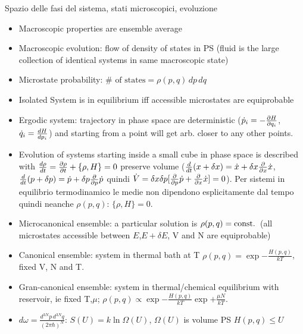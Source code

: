     \begin{frame}{Spazio delle fasi del sistema, stati microscopici, evoluzione}%
\begin{itemize}
    \item Macroscopic properties are ensemble average
    \item Macroscopic evolution: flow of density of states in PS (fluid is the large collection of identical systems in same macroscopic state)
    \item Microstate probability: $\#\text{ of states}=\rho(p,q)\,dp\,dq$
    \item Isolated System is in equilibrium iff accessible microstates are equiprobable
\item Ergodic system: trajectory in phase space are deterministic ($\dot{p}_i=-\PDy{q_i}{H}$, $\dot{q}_i=\TDy{p_i}{H}$) and starting from a point will get arb. closer to any other points.
\item Evolution of systems starting inside a small cube in phase space is described with $\TDy{t}{\rho}=\PDy{t}{\rho}+\{\rho,H\}=0$ preserve volume ($\TDof{t}(x+\delta x)=\dot{x}+\delta x\PDof{x}\dot{x}$,$\TDof{t}(p+\delta p)=\dot{p}+\delta p\PDof{p}\dot{p}$ quindi $\dot{V}=\delta x\delta p[\PDof{p}\dot{p}+\PDof{x}\dot{x}]=0$). Per sistemi in equilibrio termodinamico le medie non dipendono esplicitamente dal tempo quindi neanche $\rho(p,q)$: $\{\rho,H\}=0$.
\item Microcanonical ensemble: a particular solution is $\rho(p,q)=\const{}$ (all microstates accessible between $E$,$E+\delta E$, V and N are equiprobable)
\item Canonical ensemble: system in thermal bath at T $\rho(p,q)=\exp{-\frac{H(p,q)}{kT}}$, fixed V, N and T.
\item Gran-canonical ensemble: system in thermal/chemical equilibrium with reservoir, ie fixed T,$\mu$; $\rho(p,q)\propto\exp{-\frac{H(p,q)}{kT}}\exp{+\frac{\mu N}{kT}}$.
\item $d\omega=\frac{d^{3N}p\,d^{3N}q}{(2\pi\hbar)^N}$: $S(U)=k\ln{\Omega(U)}$, $\Omega(U)$ is volume PS $H(p,q)\leq U$
\end{itemize}
\end{frame}

